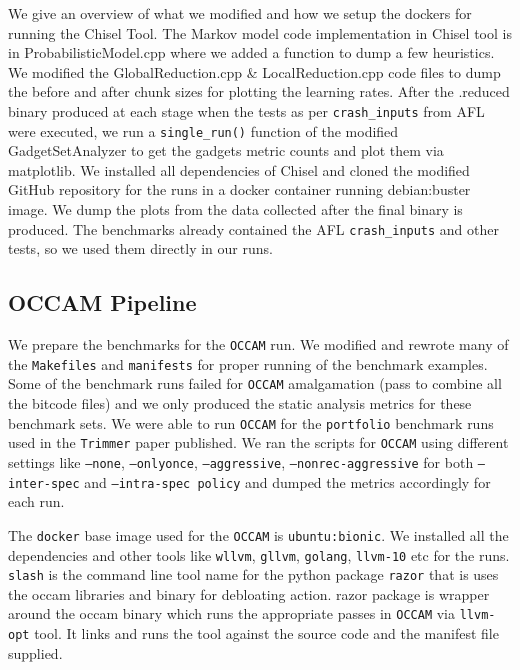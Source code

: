 \documentclass{relatorio}
\begin{document}
We give an overview of what we modified and how we setup the dockers for running the Chisel Tool. The Markov model  code implementation in Chisel tool is in ProbabilisticModel.cpp where we added a function to dump a few heuristics.
We modified the GlobalReduction.cpp \& LocalReduction.cpp code files to dump the before and after chunk sizes for plotting the learning rates. After the .reduced binary produced at each stage when the tests as per \texttt{crash\_inputs} from AFL were executed, we run a \texttt{single\_run()} function of the modified GadgetSetAnalyzer to get the gadgets metric counts and plot them via matplotlib. We installed all dependencies of Chisel and cloned the modified GitHub repository for the runs in a docker container running debian:buster image. We dump the plots from the data collected after the final binary is produced. The benchmarks already contained the AFL \texttt{crash\_inputs} and other tests, so we used them directly in our runs. 

\subsection{OCCAM Pipeline}%
\label{Tools}

We prepare the benchmarks for the \texttt{OCCAM} run. We modified and rewrote many of the \texttt{Makefiles} and \texttt{manifests} for proper running of the benchmark examples. Some of the benchmark runs failed for \texttt{OCCAM} amalgamation (pass to combine all the bitcode files) and we only produced the static analysis metrics for these benchmark sets. We were able to run \texttt{OCCAM} for the \texttt{portfolio} benchmark runs used in the \texttt{Trimmer} paper published. We ran the scripts for \texttt{OCCAM} using different settings like \texttt{--none}, \texttt{--onlyonce}, \texttt{--aggressive}, \texttt{--nonrec-aggressive} for both \texttt{--inter-spec} and \texttt{--intra-spec policy} and dumped the metrics accordingly for each run. 

The \texttt{docker} base image used for the \texttt{OCCAM} is \texttt{ubuntu:bionic}. We installed all the dependencies and other tools like \texttt{wllvm}, \texttt{gllvm}, \texttt{golang}, \texttt{llvm-10} etc for the runs. \texttt{slash} is the command line tool name for the python package \texttt{razor} that is uses the occam libraries and binary for debloating action. razor package is wrapper around the occam binary which runs the appropriate passes in \texttt{OCCAM} via \texttt{llvm-opt} tool. It links and runs the tool against the source code and the manifest file supplied. 
\end{document}
